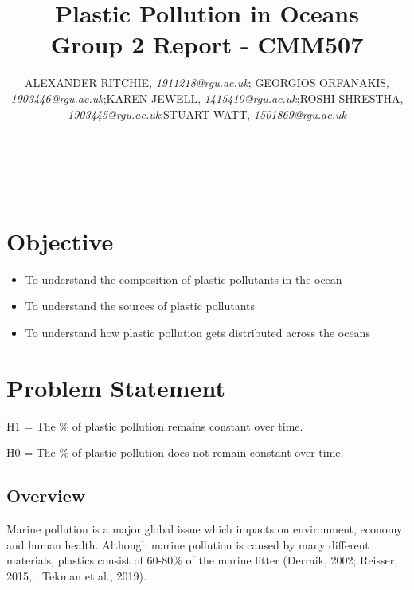 \documentclass[10pt]{article}\usepackage[]{graphicx}\usepackage[]{color}
\begin{document}
\title{\LARGE Plastic Pollution in Oceans  \\ Group 2 Report - CMM507}

\author{ALEXANDER RITCHIE, \textit{\href{1911218@rgu.ac.uk}{1911218@rgu.ac.uk}}; GEORGIOS ORFANAKIS, \textit{\href{1903446@rgu.ac.uk}{1903446@rgu.ac.uk}};KAREN JEWELL, \textit{\href{1415410@rgu.ac.uk}{1415410@rgu.ac.uk}};ROSHI SHRESTHA, \textit{\href{1903445@rgu.ac.uk}{1903445@rgu.ac.uk}};STUART WATT, \textit{\href{1501869@rgu.ac.uk}{1501869@rgu.ac.uk}}}

\maketitle
\noindent\rule{16cm}{0.4pt}
\ \\

\section*{Objective}


\begin{itemize}
\item To understand the composition of plastic pollutants in the ocean
\item To understand the sources of plastic pollutants
\item To understand how plastic pollution gets distributed across the oceans
\end{itemize}

\section{Problem Statement}\label{statement}

H1 = The \% of plastic pollution remains constant over time.

H0 = The \% of plastic pollution does not remain constant over time.


\subsection{Overview}\label{over}

Marine pollution is a major global issue which impacts on environment, economy and human health. Although marine pollution is caused by many different materials, plastics consist of 60-80\% of the marine litter (Derraik, 2002; Reisser, 2015, \cite{BARBOZA2020134625}; Tekman et al., 2019). 
\end{document}
